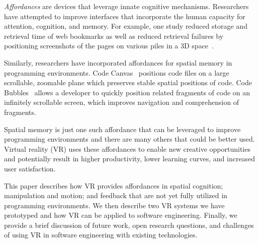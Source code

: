 \documentclass[conference]{IEEEtran}
\begin{document}
\emph{Affordances} are devices that leverage innate cognitive mechanisms.
Researchers have attempted to improve interfaces that incorporate the human capacity for attention, cognition, and memory.
For example, one study reduced storage and retrieval time of web bookmarks as well as reduced retrieval failures by positioning screenshots of the pages on various piles in a 3D space~\cite{Robertson:1998}.

Similarly, researchers have incorporated affordances for spatial memory in programming environments.  Code Canvas~\cite{DeLine:CodeCanvas} positions code files on a large scrollable, zoomable plane which preserves stable spatial positions of code.  Code Bubbles~\cite{Bragdon:CodeBubbles} allows a developer to quickly position related fragments of code on an infinitely scrollable screen, which improves navigation and comprehension of fragments.  


Spatial memory is just one such affordance that can be leveraged to improve programming environments and there are many others that could be better used. 
Virtual reality (VR) uses these affordances to enable new creative opportunities and potentially result in higher productivity, lower learning curves, and increased user satisfaction.

This paper describes how VR provides affordances in spatial cognition; manipulation and motion; and feedback that are not yet fully utilized in programming environments.
We then describe two VR systems we have prototyped and how VR can be applied to software engineering.
Finally, we provide a brief discussion of future work, open research questions, and challenges of using VR in software engineering with existing technologies.


\end{document}
